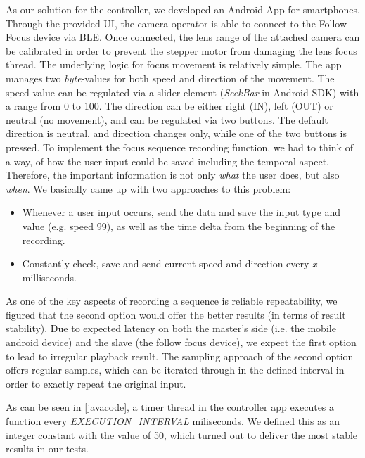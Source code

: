 \documentclass{sigchi}
\begin{document}
As our solution for the controller, we developed an Android App for smartphones. Through the provided UI, the camera operator is able to connect to the Follow Focus device via BLE. 
Once connected, the lens range of the attached camera can be calibrated in order to prevent the stepper motor from damaging the lens focus thread.
The underlying logic for focus movement is relatively simple. The app manages two \textit{byte}-values for both speed and direction of the movement.
The speed value can be regulated via a slider element (\textit{SeekBar} in Android SDK) with a range from 0 to 100. The direction can be either right (IN), left (OUT) or neutral (no movement), and can be regulated via two buttons. The default direction is neutral, and direction changes only, while one of the two buttons is pressed.  \newline
To implement the focus sequence recording function, we had to think of a way, of how the user input could be saved including the temporal aspect. Therefore, the important information is not only \textit{what} the user does, but also \textit{when}. We basically came up with two approaches to this problem: \newline
\begin{itemize}
  \item Whenever a user input occurs, send the data and save the input type and value (e.g. speed 99), as well as the time delta from the beginning of the recording.
  \item Constantly check, save and send current speed and direction every \textit{x} milliseconds.
\end{itemize}

As one of the key aspects of recording a sequence is reliable repeatability, we figured that the second option would offer the better results (in terms of result stability). Due to expected latency on both the master's side (i.e. the mobile android device) and the slave (the follow focus device), we expect the first option to lead to irregular playback result. \newline
The sampling approach of the second option offers regular samples, which can be iterated through in the defined interval in order to exactly repeat the original input.



As can be seen in \autoref{javacode}, a timer thread in the controller app executes a function every \textit{EXECUTION\_INTERVAL} miliseconds. We defined this as an integer constant with the value of 50, which turned out to deliver the most stable results in our tests. 
\end{document}
